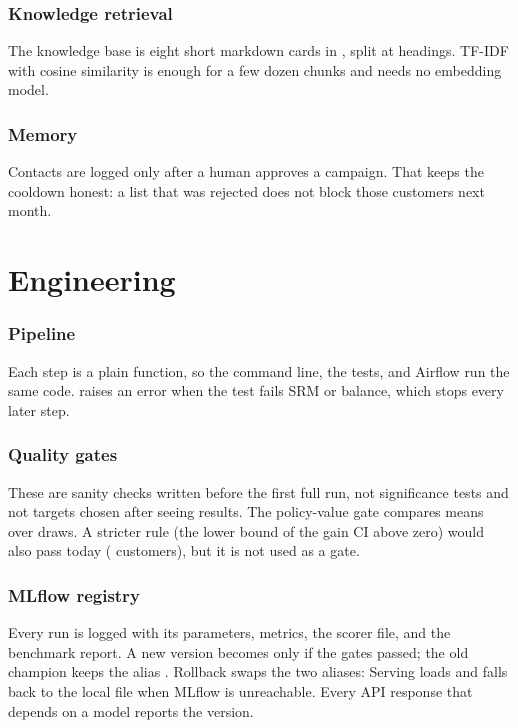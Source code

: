 \documentclass[11pt]{article}
\begin{document}
\section{Knowledge retrieval}
\label{sec:rag}
The knowledge base is eight short markdown cards in , split at \cmd{\#\#} headings. TF-IDF with cosine similarity is enough for a few dozen chunks and needs no embedding model.

\section{Memory}
\label{sec:memory}
Contacts are logged only after a human approves a campaign. That keeps the cooldown honest: a list that was rejected does not block those customers next month.

\part{Engineering}

\section{Pipeline}
\label{sec:pipeline}
Each step is a plain function, so the command line, the tests, and Airflow run the same code.
 raises an error when the test fails SRM or balance, which stops every later step.

\section{Quality gates}
\label{sec:gates}
These are sanity checks written before the first full run, not significance tests and not targets chosen after seeing results. The policy-value gate compares means over draws. A stricter rule (the lower bound of the gain CI above zero) would also pass today (\RgainAbsLo{} customers), but it is not used as a gate.

\section{MLflow registry}
\label{sec:registry}
Every run is logged with its parameters, metrics, the scorer file, and the benchmark report. A new version becomes  only if the gates passed; the old champion keeps the alias . Rollback swaps the two aliases:
Serving loads  and falls back to the local file when MLflow is unreachable. Every API response that depends on a model reports the version.
\end{document}
